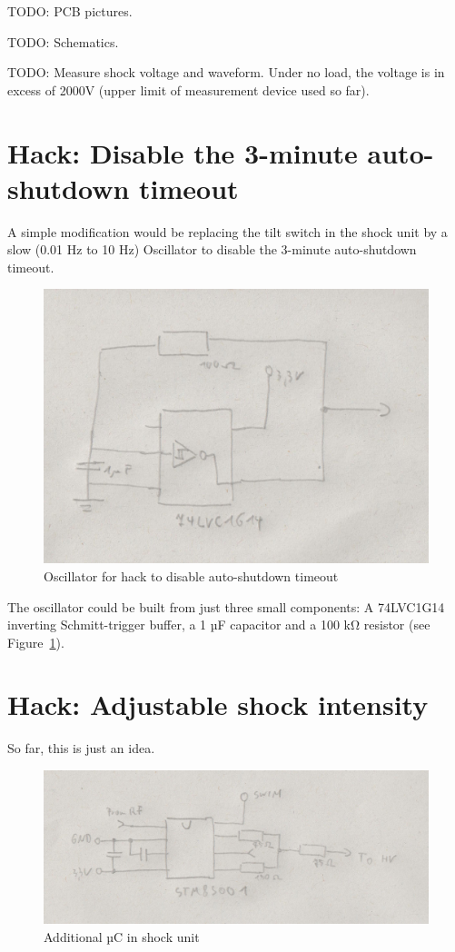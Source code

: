 \documentclass[a4paper]{article}
\begin{document}
TODO: PCB pictures.

TODO: Schematics.

TODO: Measure shock voltage and waveform. Under no load, the voltage is in excess of 2000V (upper limit of measurement device used so far).

\section{Hack: Disable the 3-minute auto-shutdown timeout}

A simple modification would be replacing the tilt switch in the shock unit by a slow (0.01 Hz to 10 Hz) Oscillator to disable the 3-minute auto-shutdown timeout.

\begin{figure}
	\centerline{\includegraphics[scale=0.5]{auto-shutdown-timeout-hack.jpeg}}
	\caption{\label{auto-shutdown-timeout-hack}Oscillator for hack to disable auto-shutdown timeout}
\end{figure}

The oscillator could be built from just three small components: A 74LVC1G14 inverting Schmitt-trigger buffer, a 1 µF capacitor and a 100 k\si{\ohm} resistor (see Figure~\ref{auto-shutdown-timeout-hack}).

\section{Hack: Adjustable shock intensity}

So far, this is just an idea.

\begin{figure}
	\centerline{\includegraphics[scale=0.5]{level-hack-shock-unit.jpeg}}
	\caption{\label{level-hack-shock-unit}Additional µC in shock unit}
\end{figure}
\end{document}
